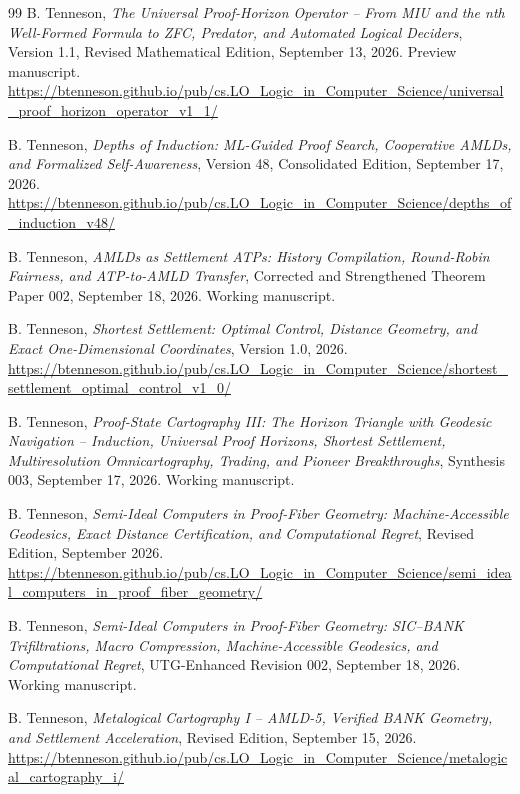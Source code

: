 \documentclass[11pt]{article}
\theoremstyle{definition}
\begin{document}
\begin{thebibliography}{99}
B. Tenneson, \emph{The Universal Proof-Horizon Operator -- From MIU and the nth Well-Formed Formula to ZFC, Predator, and Automated Logical Deciders}, Version 1.1, Revised Mathematical Edition, September 13, 2026. Preview manuscript.\\
\url{https://btenneson.github.io/pub/cs.LO_Logic_in_Computer_Science/universal_proof_horizon_operator_v1_1/}

B. Tenneson, \emph{Depths of Induction: ML-Guided Proof Search, Cooperative AMLDs, and Formalized Self-Awareness}, Version 48, Consolidated Edition, September 17, 2026.\\
\url{https://btenneson.github.io/pub/cs.LO_Logic_in_Computer_Science/depths_of_induction_v48/}

B. Tenneson, \emph{AMLDs as Settlement ATPs: History Compilation, Round-Robin Fairness, and ATP-to-AMLD Transfer}, Corrected and Strengthened Theorem Paper 002, September 18, 2026. Working manuscript.

B. Tenneson, \emph{Shortest Settlement: Optimal Control, Distance Geometry, and Exact One-Dimensional Coordinates}, Version 1.0, 2026.\\
\url{https://btenneson.github.io/pub/cs.LO_Logic_in_Computer_Science/shortest_settlement_optimal_control_v1_0/}

B. Tenneson, \emph{Proof-State Cartography III: The Horizon Triangle with Geodesic Navigation -- Induction, Universal Proof Horizons, Shortest Settlement, Multiresolution Omnicartography, Trading, and Pioneer Breakthroughs}, Synthesis 003, September 17, 2026. Working manuscript.

B. Tenneson, \emph{Semi-Ideal Computers in Proof-Fiber Geometry: Machine-Accessible Geodesics, Exact Distance Certification, and Computational Regret}, Revised Edition, September 2026.\\
\url{https://btenneson.github.io/pub/cs.LO_Logic_in_Computer_Science/semi_ideal_computers_in_proof_fiber_geometry/}

B. Tenneson, \emph{Semi-Ideal Computers in Proof-Fiber Geometry: SIC--BANK Trifiltrations, Macro Compression, Machine-Accessible Geodesics, and Computational Regret}, UTG-Enhanced Revision 002, September 18, 2026. Working manuscript.

B. Tenneson, \emph{Metalogical Cartography I -- AMLD-5, Verified BANK Geometry, and Settlement Acceleration}, Revised Edition, September 15, 2026.\\
\url{https://btenneson.github.io/pub/cs.LO_Logic_in_Computer_Science/metalogical_cartography_i/}


\end{thebibliography}
\end{document}
